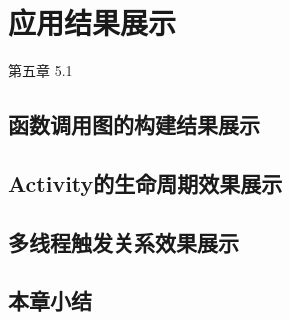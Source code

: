 \chapter{应用结果展示}  
\label{ch5}
第五章	
5.1	
\section{函数调用图的构建结果展示}
\section{Activity的生命周期效果展示}
\section{多线程触发关系效果展示}

 \section{本章小结}
